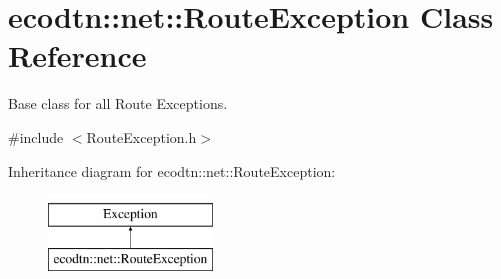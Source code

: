 \hypertarget{classecodtn_1_1net_1_1RouteException}{}\section{ecodtn\+:\+:net\+:\+:Route\+Exception Class Reference}
\label{classecodtn_1_1net_1_1RouteException}


Base class for all Route Exceptions.  




{\ttfamily \#include $<$Route\+Exception.\+h$>$}

Inheritance diagram for ecodtn\+:\+:net\+:\+:Route\+Exception\+:\begin{figure}[H]
\begin{center}
\leavevmode
\includegraphics[height=2.000000cm]{classecodtn_1_1net_1_1RouteException}
\end{center}
\end{figure}
